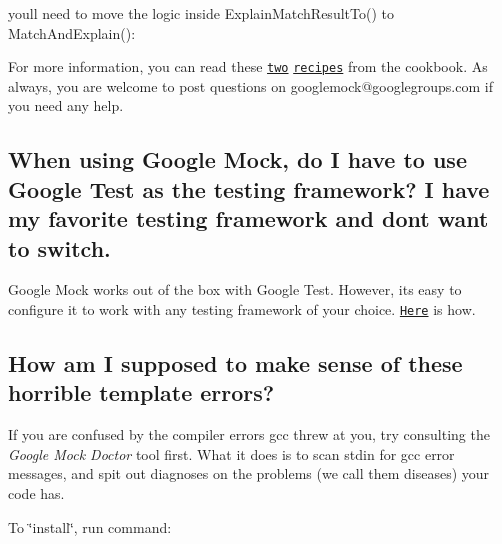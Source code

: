 you\textquotesingle{}ll need to move the logic inside {\ttfamily Explain\+Match\+Result\+To()} to {\ttfamily Match\+And\+Explain()}\+: 
\begin{DoxyCode}{0}
\DoxyCodeLine{  \}}
\DoxyCodeLine{\};}
\end{DoxyCode}


For more information, you can read these \href{CookBook.md#writing-new-monomorphic-matchers}{\tt two} \href{CookBook.md#writing-new-polymorphic-matchers}{\tt recipes} from the cookbook. As always, you are welcome to post questions on {\ttfamily googlemock@googlegroups.\+com} if you need any help.

\subsection*{When using Google Mock, do I have to use Google Test as the testing framework? I have my favorite testing framework and don\textquotesingle{}t want to switch.}

Google Mock works out of the box with Google Test. However, it\textquotesingle{}s easy to configure it to work with any testing framework of your choice. \href{ForDummies.md#using-google-mock-with-any-testing-framework}{\tt Here} is how.

\subsection*{How am I supposed to make sense of these horrible template errors?}

If you are confused by the compiler errors gcc threw at you, try consulting the {\itshape Google Mock Doctor} tool first. What it does is to scan stdin for gcc error messages, and spit out diagnoses on the problems (we call them diseases) your code has.

To \char`\"{}install\char`\"{}, run command\+: 
\begin{DoxyCode}{0}
\end{DoxyCode}


